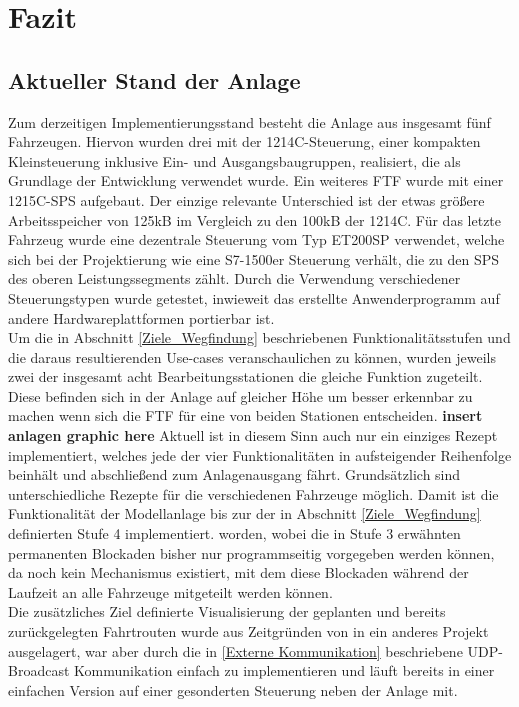 \chapter{Fazit}

\section{Aktueller Stand der Anlage}
	\label{Stand}
	Zum derzeitigen Implementierungsstand besteht die Anlage aus insgesamt fünf Fahrzeugen. Hiervon wurden drei mit der 1214C-Steuerung, einer kompakten Kleinsteuerung inklusive Ein- und Ausgangsbaugruppen, realisiert, die als Grundlage der Entwicklung verwendet wurde. Ein weiteres \ac{FTF} wurde mit einer 1215C-\ac{SPS} aufgebaut. Der einzige relevante Unterschied ist der etwas größere Arbeitsspeicher von 125kB im Vergleich zu den 100kB der 1214C. Für das letzte Fahrzeug wurde eine dezentrale Steuerung vom Typ ET200SP verwendet, welche sich bei der Projektierung wie eine S7-1500er Steuerung verhält, die zu den \ac{SPS} des oberen Leistungssegments zählt. Durch die Verwendung verschiedener Steuerungstypen wurde getestet, inwieweit das erstellte Anwenderprogramm auf andere Hardwareplattformen portierbar ist. 
	\\[4pt]
	Um die in Abschnitt \ref{Ziele_Wegfindung} beschriebenen Funktionalitätsstufen und die daraus resultierenden Use-cases veranschaulichen zu können, wurden jeweils zwei der insgesamt acht Bearbeitungsstationen die gleiche Funktion zugeteilt. Diese befinden sich in der Anlage auf gleicher Höhe um besser erkennbar zu machen wenn sich die \ac{FTF} für eine von beiden Stationen entscheiden. \textbf{insert anlagen graphic here} Aktuell ist in diesem Sinn auch nur ein einziges Rezept implementiert, welches jede der vier Funktionalitäten in aufsteigender Reihenfolge beinhält und abschließend zum Anlagenausgang fährt. Grundsätzlich sind unterschiedliche Rezepte für die verschiedenen Fahrzeuge möglich. Damit ist die Funktionalität der Modellanlage bis zur der in Abschnitt \ref{Ziele_Wegfindung} definierten Stufe 4 implementiert. worden, wobei die in Stufe 3 erwähnten permanenten Blockaden bisher nur programmseitig vorgegeben werden können, da noch kein Mechanismus existiert, mit dem diese Blockaden während der Laufzeit an alle Fahrzeuge mitgeteilt werden können.
	\\[4pt]
	Die zusätzliches Ziel definierte Visualisierung der geplanten und bereits zurückgelegten Fahrtrouten wurde aus Zeitgründen von in ein anderes Projekt ausgelagert, war aber durch die in \ref{Externe Kommunikation} beschriebene \ac{UDP}-Broadcast Kommunikation einfach zu implementieren und läuft bereits in einer einfachen Version auf einer gesonderten Steuerung neben der Anlage mit.
	

